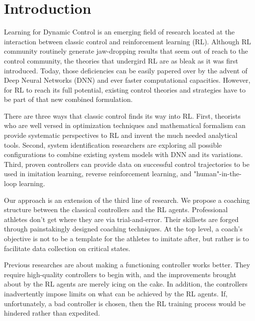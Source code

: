 \documentclass[AMS,STIX1COL]{WileyNJD-v2}
\begin{document}
\section{Introduction}
Learning for Dynamic Control is an emerging field of research located at the interaction between classic control and reinforcement learning (RL). Although RL community routinely generate jaw-dropping results that seem out of reach to the control community\citet{Dao2020AdaptiveRL}\citet{Zheng2020BalanceCF}\citet{Xin2020RobustES}\citet{Dornheim2018ModelfreeAO}, the theories that undergird RL are as bleak as it was first introduced\citet{Bertsekas1996NeuroDynamicP}. Today, those deficiencies can be easily papered over by the advent of Deep Neural Networks (DNN) and ever faster computational capacities. However, for RL to reach its full potential, existing control theories and strategies have to be part of that new combined formulation.

There are three ways that classic control finds its way into RL. First, theorists who are well versed in optimization techniques and mathematical formalism can provide systematic perspectives to RL and invent the much needed analytical tools\citet{Han2020ActorCriticRL}\citet{Weinan2017APO}\citet{Dupont2019AugmentedNO}\citet{Betancourt2018OnSO}\citet{Nachum2020ReinforcementLV}\citet{Lv2019ApproximateOS}. Second, system identification researchers are exploring all possible configurations to combine existing system models with DNN and its variations\citet{Hewing2020LearningBasedMP}\citet{Mohan2020EmbeddingHP}\citet{Lusch2018DeepLF}\citet{Bai2019DeepEM}\citet{BelbutePeres2020CombiningDP}\citet{Oh2020DeepRB}\citet{Cheng2019OnorbitRU}. Third, proven controllers can provide data on successful control trajectories to be used in imitation learning, reverse reinforcement learning, and "human"-in-the-loop learning\citet{Knox2009InteractivelySA}\citet{Knox2010CombiningMF}\citet{Peng2018DeepMimicED}\citet{Peng2020LearningAR}\citet{Paine2018OneShotHI}\citet{Choi2017InverseRL}.

Our approach is an extension of the third line of research. We propose a coaching structure between the classical controllers and the RL agents. Professional athletes don't get where they are via trial-and-error. Their skillsets are forged through painstakingly designed coaching techniques. At the top level, a coach's objective is not to be a template for the athletes to imitate after, but rather is to facilitate data collection on critical states. 

Previous researches\citet{Xie2018LearningWT}\citet{Carlucho2017IncrementalQS}\citet{Pavse2020RIDMRI}\citet{Choi2017InverseRL} are about making a functioning controller works better. They require high-quality controllers to begin with, and the improvements brought about by the RL agents are merely icing on the cake. In addition, the controllers inadvertently impose limits on what can be achieved by the RL agents. If, unfortunately, a bad controller is chosen, then the RL training process would be hindered rather than expedited. 
\end{document}
